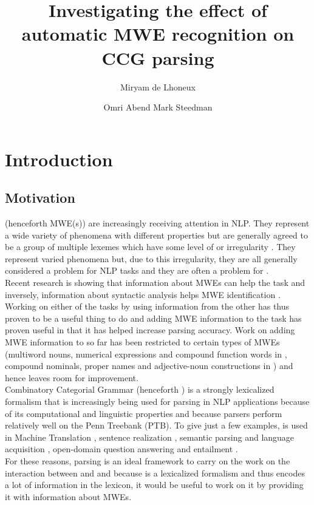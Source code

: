 \documentclass[output=paper]{langsci/langscibook}
\author{Miryam de Lhoneux\affiliation{Uppsala University}\and Omri Abend \affiliation{Hebrew University of Jerusalem}\lastand Mark Steedman \affiliation{University of Edinburgh}}
\title{Investigating the effect of automatic MWE recognition on CCG parsing}
\begin{document}
\section{Introduction}
\label{del:introduction}

\subsection{Motivation}
\indent {} (henceforth MWE(s)) are increasingly receiving attention in NLP. They represent a wide variety of phenomena with different properties but are generally agreed to be a group of multiple lexemes which have some level of  or irregularity \citep{sag02}. They represent varied phenomena but, due to this irregularity, they are all generally considered a problem for NLP tasks and they are often a problem for . \\
\indent Recent research is showing that information about MWEs can help the  task \citep{nivre2004multiword,korkontzelosetal2010} and inversely, information about syntactic analysis helps MWE identification \citep{green13,weller&heid2010,martens&vandeghinste2010}. Working on either of the tasks by using information from the other has thus proven to be a useful thing to do and adding MWE information to the  task has proven useful in that it has helped increase parsing accuracy. Work on adding MWE information to  so far has been restricted to certain types of MWEs (multiword nouns, numerical expressions and compound function words in \citet{nivre2004multiword}, compound nominals, proper names and adjective-noun constructions in \citet{korkontzelosetal2010}) and hence leaves room for improvement.\\
\indent Combinatory Categorial Grammar (henceforth ) is a strongly lexicalized formalism that is increasingly being used for parsing in NLP applications because of its computational and linguistic properties and because  parsers perform relatively well on the Penn Treebank (PTB). To give just a few examples,  is used in Machine Translation \citep[e.g.][]{birch2007ccg}, sentence realization \citep[e.g][]{white2006efficient}, semantic parsing and language acquisition \citep[e.g.][]{krishnamurthy2012weakly}, open-domain question answering and entailment \citep[e.g.][]{lewis2013combining}.\\
\indent For these reasons,  parsing is an ideal framework to carry on the work on the interaction between  and  and because  is a lexicalized formalism and thus encodes a lot of information in the lexicon, it would be useful to work on it by providing it with information about MWEs. 
\end{document}
